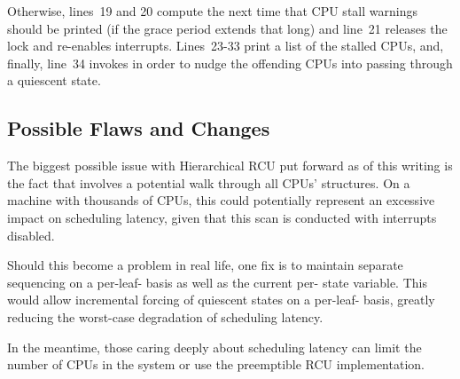 Otherwise, lines~19 and 20 compute the next time that CPU stall warnings
should be printed (if the grace period extends that long) and
line~21 releases the lock and re-enables interrupts.
Lines~23-33 print a list of the stalled CPUs, and, finally,
line~34 invokes  in order to nudge the
offending CPUs into passing through a quiescent state.

\subsection{Possible Flaws and Changes}
\label{app:rcuimpl:rcutreewt:Possible Flaws and Changes}

The biggest possible issue with Hierarchical RCU put forward as of this
writing is the fact that  involves a
potential walk through all CPUs'  structures.
On a machine with thousands of CPUs, this could potentially represent
an excessive impact on scheduling latency, given that this scan is
conducted with interrupts disabled.

Should this become a problem in real life, one fix is to maintain
separate  sequencing on a
per-leaf- basis as well as the current per-
 state variable.
This would allow incremental forcing of quiescent states on a
per-leaf- basis, greatly reducing the worst-case degradation
of scheduling latency.

In the meantime, those caring deeply about scheduling latency can
limit the number of CPUs in the system or use the preemptible RCU
implementation.

